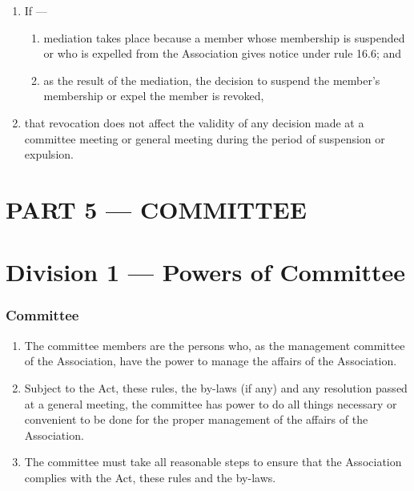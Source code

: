 \begin{enumerate}

\item If ---

  \begin{enumerate}
  
  \item mediation takes place because a member whose membership is suspended or who is expelled from the Association gives notice under rule 16.6; and
  \item as the result of the mediation, the decision to suspend the member's membership or expel the member is revoked,
  \end{enumerate}
\item that revocation does not affect the validity of any decision made at a committee meeting or general meeting during the period of suspension or expulsion.
\end{enumerate}

\hypertarget{part-5-committee}{%
\part{PART 5 --- COMMITTEE}\label{part-5-committee}}

\hypertarget{division-1-powers-of-committee}{%
\part*{Division 1 --- Powers of Committee}\label{division-1-powers-of-committee}}

\hypertarget{committee}{%
\section{Committee}\label{committee}}

\begin{enumerate}

\item The committee members are the persons who, as the management committee of the Association, have the power to manage the affairs of the Association.
\item Subject to the Act, these rules, the by-laws (if any) and any resolution passed at a general meeting, the committee has power to do all things necessary or convenient to be done for the proper management of the affairs of the Association.
\item The committee must take all reasonable steps to ensure that the Association complies with the Act, these rules and the by-laws.
\end{enumerate}

